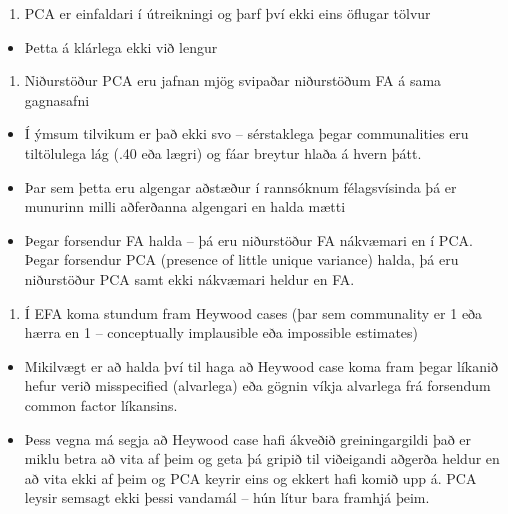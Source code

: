 \documentclass[]{book}
\providecommand{\tightlist}{%
  \setlength{\itemsep}{0pt}\setlength{\parskip}{0pt}}
\begin{document}
\begin{enumerate}
\def\labelenumi{\arabic{enumi})}
\tightlist
\item
  PCA er einfaldari í útreikningi og þarf því ekki eins öflugar tölvur
\end{enumerate}

\begin{itemize}
\tightlist
\item
  Þetta á klárlega ekki við lengur
\end{itemize}

\begin{enumerate}
\def\labelenumi{\arabic{enumi})}
\setcounter{enumi}{1}
\tightlist
\item
  Niðurstöður PCA eru jafnan mjög svipaðar niðurstöðum FA á sama gagnasafni
\end{enumerate}

\begin{itemize}
\tightlist
\item
  Í ýmsum tilvikum er það ekki svo -- sérstaklega þegar communalities eru tiltölulega lág (.40 eða lægri) og fáar breytur hlaða á hvern þátt.
\item
  Þar sem þetta eru algengar aðstæður í rannsóknum félagsvísinda þá er munurinn milli aðferðanna algengari en halda mætti
\item
  Þegar forsendur FA halda -- þá eru niðurstöður FA nákvæmari en í PCA. Þegar forsendur PCA (presence of little unique variance) halda, þá eru niðurstöður PCA samt ekki nákvæmari heldur en FA.
\end{itemize}

\begin{enumerate}
\def\labelenumi{\arabic{enumi})}
\setcounter{enumi}{2}
\tightlist
\item
  Í EFA koma stundum fram Heywood cases (þar sem communality er 1 eða hærra en 1 -- conceptually implausible eða impossible estimates)
\end{enumerate}

\begin{itemize}
\tightlist
\item
  Mikilvægt er að halda því til haga að Heywood case koma fram þegar líkanið hefur verið misspecified (alvarlega) eða gögnin víkja alvarlega frá forsendum common factor líkansins.
\item
  Þess vegna má segja að Heywood case hafi ákveðið greiningargildi það er miklu betra að vita af þeim og geta þá gripið til viðeigandi aðgerða heldur en að vita ekki af þeim og PCA keyrir eins og ekkert hafi komið upp á. PCA leysir semsagt ekki þessi vandamál -- hún lítur bara framhjá þeim.
\end{itemize}
\end{document}
